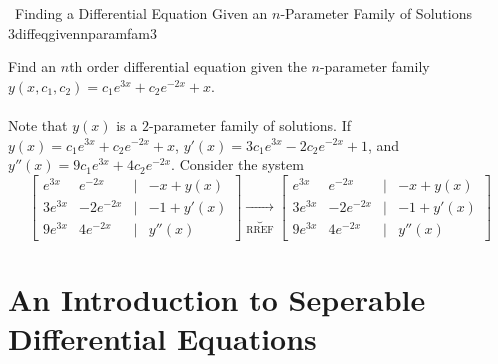         \begin{example}{\Difficulty\,\Difficulty\,\,Finding a Differential Equation Given an \(n\)-Parameter Family of Solutions 3}{diffeqgivennparamfam3}
            
            Find an \(n\)th order differential equation given the \(n\)-parameter family \(y(x,c_1,c_2)=c_1e^{3x}+c_2e^{-2x}+x\).
            \\
            \\
            Note that \(y(x)\) is a \(2\)-parameter family of solutions. If \(y(x)=c_1e^{3x}+c_2e^{-2x}+x\), \(y'(x)=3c_1e^{3x}-2c_2e^{-2x}+1\), and \(y''(x)=9c_1e^{3x}+4c_2e^{-2x}\). Consider the system
            \begin{equation*}
                \begin{bmatrix}
                    e^{3x} & e^{-2x} & | & -x+y(x) \\
                    3e^{3x} & -2e^{-2x} & | & -1+y'(x) \\
                    9e^{3x} & 4e^{-2x} & | & y''(x)
                \end{bmatrix}\underbrace{\to}_{\text{RREF}}
                \begin{bmatrix}
                    e^{3x} & e^{-2x} & | & -x+y(x) \\
                    3e^{3x} & -2e^{-2x} & | & -1+y'(x) \\
                    9e^{3x} & 4e^{-2x} & | & y''(x)
                \end{bmatrix}
            \end{equation*}

        \end{example}

    \pagebreak

    \section{An Introduction to Seperable Differential Equations}

